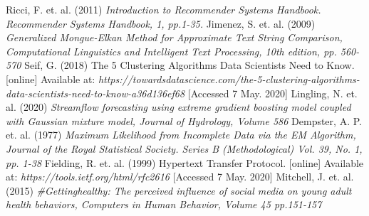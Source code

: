 \documentclass{article}
\begin{document}
\begin{thebibliography}{9}
Ricci, F. et. al. (2011) \textit{Introduction to Recommender Systems Handbook. Recommender Systems Handbook, 1, pp.1-35.}
Jimenez, S. et. al. (2009) \textit{Generalized Mongue-Elkan Method for
Approximate Text String Comparison, Computational Linguistics and Intelligent Text Processing, 10th edition, pp. 560-570}
Seif, G. (2018) The 5 Clustering Algorithms Data Scientists Need to Know. [online] Available at: \textit{https://towardsdatascience.com/the-5-clustering-algorithms-data-scientists-need-to-know-a36d136ef68} [Accessed 7 May. 2020]
Lingling, N. et. al. (2020) \textit{Streamflow forecasting using extreme gradient boosting model coupled with Gaussian mixture model, Journal of Hydrology, Volume 586}
Dempster, A. P. et. al. (1977) \textit{Maximum Likelihood from Incomplete Data via the EM Algorithm, Journal of the Royal Statistical Society. Series B (Methodological) Vol. 39, No. 1, pp. 1-38}
Fielding, R. et. al. (1999) Hypertext Transfer Protocol. [online] Available at: \textit{https://tools.ietf.org/html/rfc2616} [Accessed 7 May. 2020]
Mitchell, J. et. al. (2015) \textit{\#Gettinghealthy: The perceived influence of social media on young adult health behaviors, Computers in Human Behavior, Volume 45 pp.151-157}
\end{thebibliography}
\end{document}
